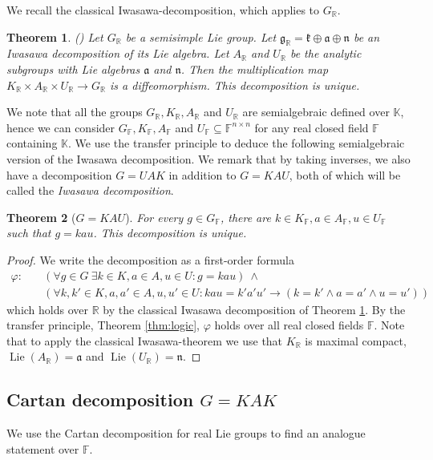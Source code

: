 \documentclass[12pt]{amsart}
\newcommand{\F}{\mathbb{F} }
\newcommand{\R}{\mathbb{R} }
\newcommand{\K}{\mathbb{K}}
\newcommand{\frakg}{\mathfrak{g}}
\newcommand{\frakk}{\mathfrak{k}}
\newcommand{\fraka}{\mathfrak{a}}
\newcommand{\frakn}{\mathfrak{n}}
\numberwithin{equation}{section}
\newtheorem{theorem}{Theorem}[section]
\theoremstyle{remark} %
\begin{document}
We recall the classical Iwasawa-decomposition, which applies to $G_{\R}$.
\begin{theorem}\label{thm:KAU_R}(\cite[Theorem 6.46]{Kna})
	Let $G_\R$ be a semisimple Lie group. Let $\frakg_\R = \frakk \oplus \fraka \oplus \frakn$ be an Iwasawa decomposition of its Lie algebra. Let $A_\R$ and $U_\R$ be the analytic subgroups with Lie algebras $\fraka$ and $\frakn$. Then the multiplication map $K_\R \times A_\R \times U_\R \to G_\R$ is a diffeomorphism. This decomposition is unique.
\end{theorem}


We note that all the groups $G_\R, K_\R, A_\R$ and $U_\R$ are semialgebraic defined over $\K$, hence we can consider $G_\F, K_\F, A_\F$ and $U_\F \subseteq \F^{n\times n}$ for any real closed field $\F$ containing $\K$. We use the transfer principle to deduce the following semialgebraic version of the Iwasawa decomposition. We remark that by taking inverses, we also have a decomposition $G=UAK$ in addition to $G=KAU$, both of which will be called the \emph{Iwasawa decomposition}.
\begin{theorem}[$G=KAU$]\label{thm:KAU}
	For every $g \in G_{\F}$, there are $k\in K_{\F}, a\in A_{\F}, u \in U_{\F}$ such that $g=kau$. This decomposition is unique. 
\end{theorem} 
\begin{proof}
	We write the decomposition as a first-order formula
	\begin{align*}
	\varphi \colon \quad & \left(\forall g \in G \ \exists k \in K , a \in A, u\in U \colon g= kau \right)\ \wedge \\
	&\left(\forall k,k' \in K, a,a'\in A, u,u'\in U \colon kau = k'a'u' \to \left(k=k' \wedge a=a' \wedge u = u'\right) \right)	
	\end{align*}
	which holds over $\R$ by the classical Iwasawa decomposition of Theorem \ref{thm:KAU_R}.
	By the transfer principle, Theorem \ref{thm:logic}, $\varphi$ holds over all real closed fields $\F$. Note that to apply the classical Iwasawa-theorem we use that $K_\R$ is maximal compact, $\operatorname{Lie}(A_\R) = \fraka$ and $\operatorname{Lie}(U_\R)= \frakn$.
\end{proof}

\subsection{Cartan decomposition $G=KAK$}\label{sec:KAK}

We use the Cartan decomposition for real Lie groups to find an analogue statement over $\F$.
\end{document}
